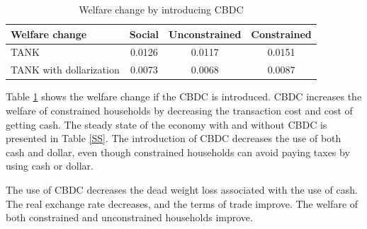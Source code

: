 \documentclass[12pt]{article}
\begin{document}
\begin{table}[h!]
\centering
\begin{tabular}{lccc}
\hline\hline
Welfare change & Social & Unconstrained & Constrained  \\ \hline
TANK &     0.0126  &  0.0117 &   0.0151 \\
TANK with dollarization &  0.0073  &  0.0068  &  0.0087 \\\hline
\end{tabular}
\caption{Welfare change by introducing CBDC}
\label{Welfare2}
\end{table}

Table \ref{Welfare2} shows the welfare change if the CBDC is introduced. CBDC increases the welfare of constrained households by decreasing the transaction cost and cost of getting cash. The steady state of the economy with and without CBDC is presented in Table \ref{SS}. The introduction of CBDC decreases the use of both cash and dollar, even though constrained households can avoid paying taxes by using cash or dollar. 

The use of CBDC decreases the dead weight loss associated with the use of cash. The real exchange rate decreases, and the terms of trade improve. The welfare of both constrained and unconstrained households improve. 
\end{document}

